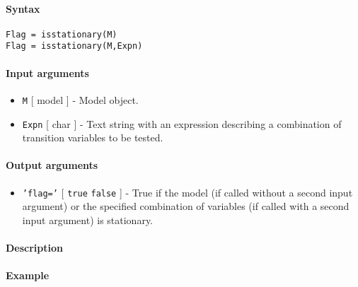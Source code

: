 


	\paragraph{Syntax}\label{syntax}

\begin{verbatim}
Flag = isstationary(M)
Flag = isstationary(M,Expn)
\end{verbatim}

\paragraph{Input arguments}\label{input-arguments}

\begin{itemize}
\item
  \texttt{M} {[} model {]} - Model object.
\item
  \texttt{Expn} {[} char {]} - Text string with an expression describing
  a combination of transition variables to be tested.
\end{itemize}

\paragraph{Output arguments}\label{output-arguments}

\begin{itemize}
\itemsep1pt\parskip0pt
\item
  \texttt{'flag='} {[} \texttt{true} \textbar{} \texttt{false} {]} -
  True if the model (if called without a second input argument) or the
  specified combination of variables (if called with a second input
  argument) is stationary.
\end{itemize}

\paragraph{Description}\label{description}

\paragraph{Example}\label{example}


